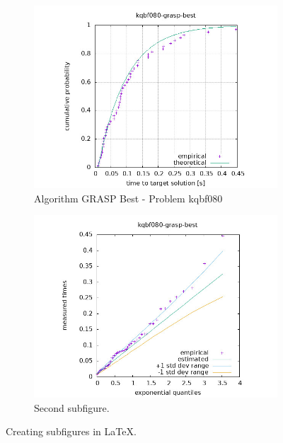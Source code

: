 \begin{figure}[H]
    \centering
    \begin{subfigure}{0.49\textwidth}
        \includegraphics[width=\textwidth]{figure/ttt_plot/kqbf080-grasp-best-exp.jpeg}
        \caption{Algorithm GRASP Best - Problem kqbf080}
        \label{fig:grasp-best-kqbf080-exp}
    \end{subfigure}
    \hfill
    \begin{subfigure}{0.49\textwidth}
        \includegraphics[width=\textwidth]{figure/ttt_plot/kqbf080-grasp-best-qq.jpeg}
        \caption{Second subfigure.}
        \label{fig:grasp-best-kqbf080-qq}
    \end{subfigure}
    \caption{Creating subfigures in \LaTeX.}
    \label{fig:grasp-best-kqbf080}
\end{figure}


